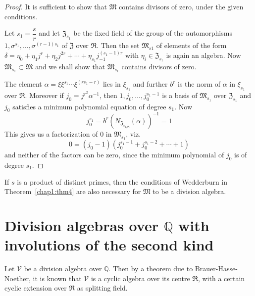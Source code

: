 \begin{proof}
It is \pageoriginale sufficient to show that $\mathfrak{M}$ contains
divisors of zero, under the given conditions.

Let $s_1 = \dfrac{s}{r}$ and let $\mathfrak{Z}_{s_1}$ be the fixed
field of the group of the automorphisms $1, \sigma^{s_1},\ldots,
\sigma^{(r-1)s_1}$ of $\mathfrak{Z}$ over $\mathfrak{R}$. Then the set
$\mathfrak{M}_{s1}$ of elements of the form $\delta = \eta_0 + \eta_1
j^r + \eta_2 j^{2r} + \cdots + \eta_{s_1} j^{(s_1-1)r}_{-1}$ with
$\eta_i \in \mathfrak{Z}_{s_1}$ is again an algebra. Now
$\mathfrak{M}_{s_1} \subset \mathfrak{M}$ and we shall show that
$\mathfrak{M}_{s_1}$ contains divisors of zero.

The element $\alpha=\xi \xi^{s_1} \cdots \xi^{(rs_1-r)}$ lies in
$\xi_{s_1}$ and further $b^r$ is the norm of $\alpha$ in $\xi_{s_1}$
over $\mathfrak{R}$. Moreover if $j_0 = j^{r^2} \alpha^{-1}$, then
$1,j_0,\ldots , j^{s_1-1}_0$ is a basis of $\mathfrak{M}_{s_1}$ over
$\mathfrak{Z}_{s_1}$ and $j_0$ satisfies a minimum polynomial equation
of degree $s_1$. Now
$$
j^{s_1}_0 = b^r(N_{\mathfrak{Z}_{s_{1/\mathfrak{R}}}}(\alpha))^{-1} = 1
$$
This gives us a factorization of $0$ in $\mathfrak{M}_{s_1}$, viz.
$$
0=(j_0-1)(j^{s_1-1}_0 + j^{s_1-2}_0+\cdots +1)
$$
and neither of the factors can be zero, since the minimum polynomial
of $j_0$ is of degree $s_1$.
\end{proof}

\begin{coro*}
If $s$ is a product of distinct primes, then the conditions of
Wedderburn in Theorem~\ref{chap1:thm4} are also necessary for $\mathfrak{M}$ to be a
division algebra.
\end{coro*}

\section[Division algebras over $\mathbb{Q}$...]{Division algebras over $\mathbb{Q}$ with involutions of the
  second kind}%
Let $\mathscr{V}$ be a division algebra over $\mathbb{Q}$. Then by a
theorem due to Brauer-Hasse-Noether, it is known that $\mathscr{V}$ is
a cyclic algebra over \pageoriginale its centre $\mathfrak{R}$, with a
certain cyclic extension over $\mathfrak{R}$ as splitting field.

